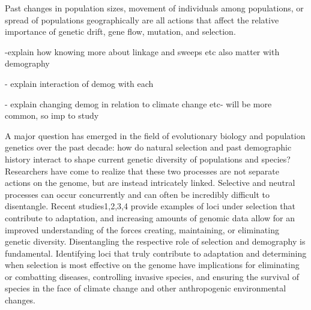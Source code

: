 Past changes in population sizes, movement of individuals among populations, or spread of populations geographically are all actions that affect the relative importance of genetic drift, gene flow, mutation, and selection.

-explain how knowing more about linkage and sweeps etc also matter with demography

- explain interaction of demog with each

- explain changing demog in relation to climate change etc- will be more common, so imp to study


A major question has emerged in the field of evolutionary biology and population genetics over the past decade: how do natural selection and past demographic history interact to shape current genetic diversity of populations and species? Researchers have come to realize that these two processes are not separate actions on the genome, but are instead intricately linked. Selective and neutral processes can occur concurrently and can often be incredibly difficult to disentangle. Recent studies1,2,3,4 provide examples of loci under selection that contribute to adaptation, and increasing amounts of genomic data allow for an improved understanding of the forces creating, maintaining, or eliminating genetic diversity. Disentangling the respective role of selection and demography is fundamental. Identifying loci that truly contribute to adaptation and determining when selection is most effective on the genome have implications for eliminating or combatting diseases, controlling invasive species, and ensuring the survival of species in the face of climate change and other anthropogenic environmental changes.

